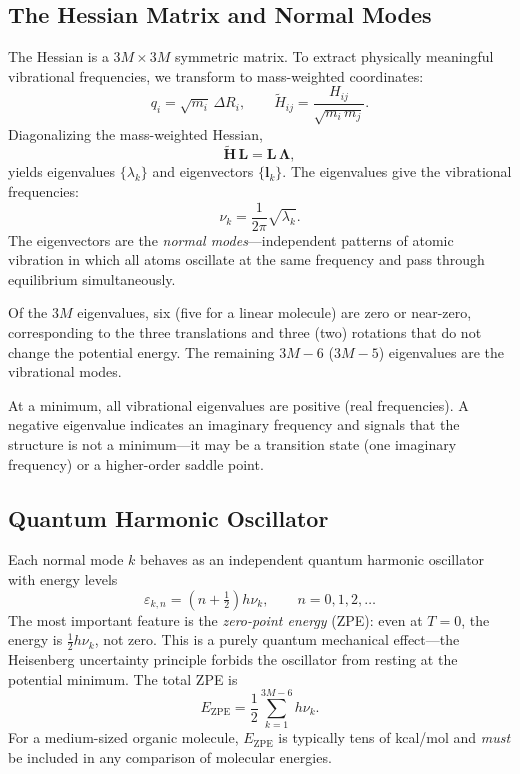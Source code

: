 \documentclass[11pt]{article}
\numberwithin{equation}{section}
\begin{document}
\subsection{The Hessian Matrix and Normal Modes}

The Hessian is a $3M\times 3M$ symmetric matrix. To extract physically meaningful vibrational frequencies, we transform to mass-weighted coordinates:
\begin{equation}
q_i = \sqrt{m_i}\,\Delta R_i, \qquad \tilde{H}_{ij} = \frac{H_{ij}}{\sqrt{m_i\,m_j}}.
\end{equation}
Diagonalizing the mass-weighted Hessian,
\begin{equation}
\tilde{\mathbf{H}}\,\mathbf{L} = \mathbf{L}\,\boldsymbol{\Lambda},
\end{equation}
yields eigenvalues $\{\lambda_k\}$ and eigenvectors $\{\mathbf{l}_k\}$. The eigenvalues give the vibrational frequencies:
\begin{equation}
\nu_k = \frac{1}{2\pi}\sqrt{\lambda_k}.
\label{eq:freq}
\end{equation}
The eigenvectors are the \emph{normal modes}---independent patterns of atomic vibration in which all atoms oscillate at the same frequency and pass through equilibrium simultaneously.

Of the $3M$ eigenvalues, six (five for a linear molecule) are zero or near-zero, corresponding to the three translations and three (two) rotations that do not change the potential energy. The remaining $3M-6$ ($3M-5$) eigenvalues are the vibrational modes.

At a minimum, all vibrational eigenvalues are positive (real frequencies). A negative eigenvalue indicates an imaginary frequency and signals that the structure is not a minimum---it may be a transition state (one imaginary frequency) or a higher-order saddle point.

\subsection{Quantum Harmonic Oscillator}

Each normal mode $k$ behaves as an independent quantum harmonic oscillator with energy levels
\begin{equation}
\varepsilon_{k,n} = \left(n + \tfrac{1}{2}\right)h\nu_k, \qquad n = 0, 1, 2, \ldots
\label{eq:QHO}
\end{equation}
The most important feature is the \emph{zero-point energy} (ZPE): even at $T = 0$, the energy is $\frac{1}{2}h\nu_k$, not zero. This is a purely quantum mechanical effect---the Heisenberg uncertainty principle forbids the oscillator from resting at the potential minimum. The total ZPE is
\begin{equation}
E_\text{ZPE} = \frac{1}{2}\sum_{k=1}^{3M-6}h\nu_k.
\label{eq:ZPE}
\end{equation}
For a medium-sized organic molecule, $E_\text{ZPE}$ is typically tens of kcal/mol and \emph{must} be included in any comparison of molecular energies.
\end{document}
